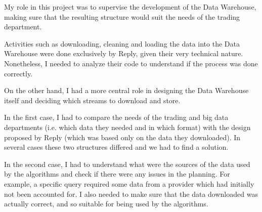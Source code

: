 My role in this project was to supervise the development of the Data Warehouse, making sure that the resulting structure would suit the needs of the trading department.

Activities such as downloading, cleaning and loading the data into the Data Warehouse were done exclusively by Reply, given their very technical nature.
Nonetheless, I needed to analyze their code to understand if the process was done correctly.

On the other hand, I had a more central role in designing the Data Warehouse itself and deciding which streams to download and store.

In the first case, I had to compare the needs of the trading and big data departments (i.e. which data they needed and in which format) with the design proposed by Reply (which was based only on the data they downloaded).
In several cases these two structures differed and we had to find a solution.

In the second case, I had to understand what were the sources of the data used by the algorithms and check if there were any issues in the planning.
For example, a specific query required some data from a provider which had initially not been accounted for.
I also needed to make sure that the data downloaded was actually correct, and so suitable for being used by the algorithms.